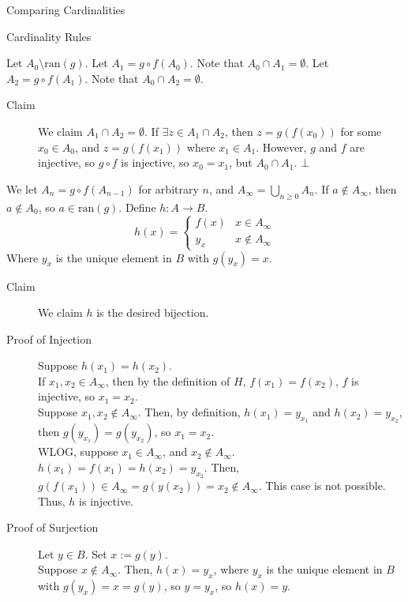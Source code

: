 \documentclass[8pt]{extarticle}
\begin{document}
\begin{problem}{Comparing Cardinalities}
\begin{problem}{Cardinality Rules}
\begin{description}
          Let $A_0 \setminus \textrm{ran}(g)$. Let $A_1 = g\circ f(A_0)$. Note that $A_0 \cap A_1 = \emptyset$. Let $A_2 = g\circ f(A_1)$. Note that $A_0\cap A_2 =\emptyset$.
          \begin{description}
            \item[Claim] We claim $A_1 \cap A_2 = \emptyset$. If $\exists z\in A_1\cap A_2$, then $z = g(f(x_0))$ for some $x_0 \in A_0$, and $z = g(f(x_1))$ where $x_1\in A_1$. However, $g$ and $f$ are injective, so $g\circ f$ is injective, so $x_0 = x_1$, but $A_0\cap A_1$. $\bot$
          \end{description}
          We let $A_n = g\circ f(A_{n-1})$ for arbitrary $n$, and $A_{\infty} = \bigcup_{n\geq 0} A_n$. If $a\notin A_{\infty}$, then $a\notin A_0$, so $a\in \textrm{ran}(g)$. Define $h: A\rightarrow B$.
          \[
            h(x) = \begin{cases}
              f(x) & x\in A_{\infty}\\
              y_x & x\notin A_{\infty}
            \end{cases}
          \] 
          Where $y_x$ is the unique element in $B$ with $g(y_x) = x$.
          \begin{description}
            \item[Claim] We claim $h$ is the desired bijection.
            \item[Proof of Injection] Suppose $h(x_1) = h(x_2)$.\\

              If $x_1,x_2\in A_{\infty}$, then by the definition of $H$, $f(x_1) = f(x_2)$, $f$ is injective, so $x_1 = x_2$.\\

              Suppose $x_1,x_2\notin A_{\infty}$. Then, by definition, $h(x_1) = y_{x_1}$ and $h(x_2) = y_{x_2}$, then $g(y_{x_1}) = g(y_{x_2})$, so $x_1 = x_2$.\\

              WLOG, suppose $x_1\in A_{\infty}$, and $x_2 \notin A_{\infty}$. $h(x_1) = f(x_1) = h(x_2) = y_{x_2}$. Then, $g(f(x_1))\in A_{\infty} = g(y(x_2)) = x_2\notin A_{\infty}$. This case is not possible.\\

              Thus, $h$ is injective.
            \item[Proof of Surjection] Let $y\in B$. Set $x := g(y)$.\\

              Suppose $x\notin A_{\infty}$. Then, $h(x) = y_x$, where $y_x$ is the unique element in $B$ with $g(y_x)=x=g(y)$, so $y = y_x$, so $h(x) = y$.\\


\end{description}
\end{description}
\end{problem}
\end{problem}
\end{document}
